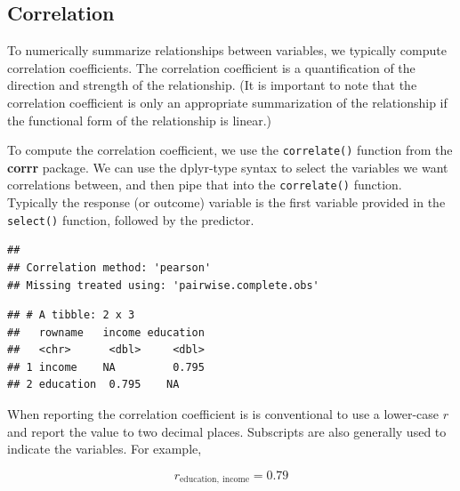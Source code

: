 \documentclass[]{book}
\newenvironment{Shaded}{\begin{snugshade}}{\end{snugshade}}
\newcommand{\CommentTok}[1]{\textcolor[rgb]{0.56,0.35,0.01}{\textit{#1}}}
\newcommand{\KeywordTok}[1]{\textcolor[rgb]{0.13,0.29,0.53}{\textbf{#1}}}
\newcommand{\NormalTok}[1]{#1}
\newcommand{\OperatorTok}[1]{\textcolor[rgb]{0.81,0.36,0.00}{\textbf{#1}}}
\newcommand{\StringTok}[1]{\textcolor[rgb]{0.31,0.60,0.02}{#1}}
\theoremstyle{definition}
\theoremstyle{definition}
\theoremstyle{definition}
\theoremstyle{remark}
\begin{document}
\hypertarget{correlation}{%
\subsection{Correlation}\label{correlation}}

To numerically summarize relationships between variables, we typically
compute correlation coefficients. The correlation coefficient is a
quantification of the direction and strength of the relationship. (It is
important to note that the correlation coefficient is only an
appropriate summarization of the relationship if the functional form of
the relationship is linear.)

To compute the correlation coefficient, we use the \texttt{correlate()}
function from the \textbf{corrr} package. We can use the dplyr-type
syntax to select the variables we want correlations between, and then
pipe that into the \texttt{correlate()} function. Typically the response
(or outcome) variable is the first variable provided in the
\texttt{select()} function, followed by the predictor.

\begin{Shaded}
\end{Shaded}

\begin{verbatim}
## 
## Correlation method: 'pearson'
## Missing treated using: 'pairwise.complete.obs'
\end{verbatim}

\begin{verbatim}
## # A tibble: 2 x 3
##   rowname   income education
##   <chr>      <dbl>     <dbl>
## 1 income    NA         0.795
## 2 education  0.795    NA
\end{verbatim}

When reporting the correlation coefficient is is conventional to use a
lower-case \(r\) and report the value to two decimal places. Subscripts
are also generally used to indicate the variables. For example,

\[
r_{\mathrm{education,~income}} = 0.79
\]
\end{document}
